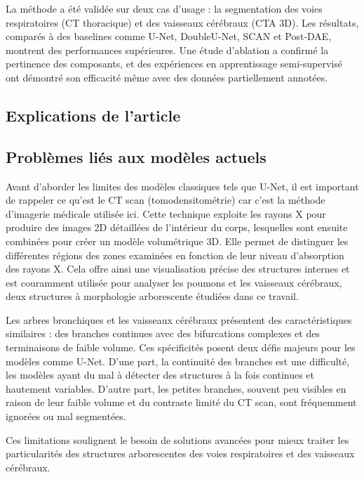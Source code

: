 \documentclass[a4paper,12pt]{article}
\begin{document}
La méthode a été validée sur deux cas d’usage : la segmentation des voies respiratoires
(CT thoracique) et des vaisseaux cérébraux (CTA 3D). Les résultats, comparés à des baselines
comme U-Net, DoubleU-Net, SCAN et Post-DAE, montrent des performances supérieures. Une
étude d’ablation a confirmé la pertinence des composants, et des expériences en apprentissage
semi-supervisé ont démontré son efficacité même avec des données partiellement annotées.
\\
\begin{multicols}{2}


\section*{Explications de l’article}

\subsection*{Problèmes liés aux modèles actuels}

Avant d’aborder les limites des modèles classiques tels que U-Net, il est important de rappeler
ce qu’est le CT scan (tomodensitométrie) car c’est la méthode d’imagerie médicale utilisée ici.
Cette technique exploite les rayons X pour produire des images 2D détaillées de l’intérieur du
corps, lesquelles sont ensuite combinées pour créer un modèle volumétrique 3D. Elle permet de
distinguer les différentes régions des zones examinées en fonction de leur niveau d’absorption des
rayons X. Cela offre ainsi une visualisation précise des structures internes et est couramment
utilisée pour analyser les poumons et les vaisseaux cérébraux, deux structures à morphologie
arborescente étudiées dans ce travail.

Les arbres bronchiques et les vaisseaux cérébraux présentent des caractéristiques similaires :
des branches continues avec des bifurcations complexes et des terminaisons de faible volume. Ces
spécificités posent deux défis majeurs pour les modèles comme U-Net. D’une part, la continuité
des branches est une difficulté, les modèles ayant du mal à détecter des structures à la fois
continues et hautement variables. D’autre part, les petites branches, souvent peu visibles en
raison de leur faible volume et du contraste limité du CT scan, sont fréquemment ignorées ou
mal segmentées.

Ces limitations soulignent le besoin de solutions avancées pour mieux traiter les particularités
des structures arborescentes des voies respiratoires et des vaisseaux cérébraux.


\end{multicols}
\end{document}
